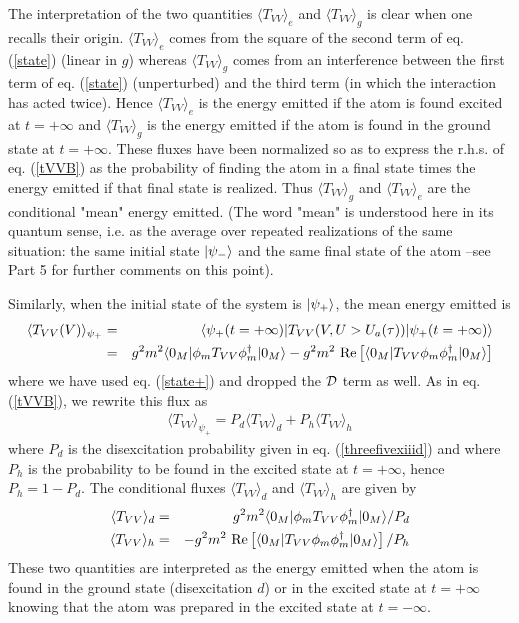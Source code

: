 \documentclass[12pt]{article}
\begin{document}
 The interpretation of the two quantities $\langle T_{VV}\rangle _{e}$ and
$\langle T_{VV} \rangle _{g}$ is clear when one
recalls their origin. $\langle T_{VV}\rangle _{e}$
comes from the square of the second term of eq.
(\ref{state}) (linear in $g$) whereas $\langle T_{VV} \rangle _{g}$ comes
from an interference between the first term of eq. (\ref{state})
(unperturbed) and the third term (in which the interaction has acted twice).
Hence $\langle T_{VV}\rangle _{e}$ is the energy emitted
if the atom is found excited at $t=+\infty$ and $\langle T_{VV}\rangle _{g}$
is the energy emitted if the atom
is found in the ground state at $t=+\infty$. These fluxes
have been normalized so as to express
the r.h.s. of eq. (\ref{tVVB})  as the probability of finding the atom in
a final state times the energy
emitted if that final state is realized.
Thus $\langle T_{VV} \rangle _{g}$  and $\langle T_{VV}\rangle _{e}$
are the conditional "mean" energy emitted. (The word "mean"  is understood
here in its quantum sense, i.e. as the average over repeated realizations
of the same situation: the same initial state $\mbox{$ \vert \psi_- \rangle $}$ and the same
final state of the atom --see Part 5 for further comments on this point).

Similarly, when the initial state of the system is $\mbox{$ \vert \psi_+ \rangle $}$,
the mean energy emitted is
\begin{eqnarray}
\langle T_{VV}(V)\rangle _{\psi_+} &=&
\mbox{$ \langle \psi_+(t=+\infty) \vert $} T_{VV} (V, U>U_a(\tau))\mbox{$ \vert \psi_+
(t=+\infty) \rangle $}
\nonumber\\
&=&
g^2m^2 \mbox{$ \langle 0_M \vert $} \phi_m  T_{VV} \phi_m^\dagger\mbox{$ \vert 0_M \rangle $}
-  g^2m^2 \mbox{ Re}\left[
\mbox{$ \langle 0_M \vert $}  T_{VV} \phi_m  \phi_m^\dagger\mbox{$ \vert 0_M \rangle $}
\right]
\label{tVV+}
\end{eqnarray}
where we have used eq. (\ref{state+}) and dropped the $\cal{D}$ term as well.
As in eq. (\ref{tVVB}), we rewrite this flux as
\begin{eqnarray}
\langle T_{VV}\rangle _{\psi_+} = P_d \langle T_{VV} \rangle _{d}
+  P_h \langle T_{VV} \rangle _{h}
\label{tVVB+}
\end{eqnarray}
where $P_d$ is the disexcitation probability given in eq.
(\ref{threefivexiiid})
and where
$P_h$ is
the probability to be found in the excited state at $t=+\infty$, hence
$
P_h =  1- P_d
$.
The conditional fluxes $\langle T_{VV}\rangle _{d}$ and
$\langle T_{VV}\rangle _{h}$ are given by
\begin{eqnarray}
\langle T_{VV}\rangle _{d}
 &=& g^2m^2 \mbox{$ \langle 0_M \vert $} \phi_m T_{VV} \phi_m^\dagger
\mbox{$ \vert 0_M \rangle $}/ P_d\nonumber\\
\langle T_{VV}\rangle _{h}
&=& - g^2m^2\mbox{ Re}\left[
 \mbox{$ \langle 0_M \vert $}  T_{VV} \phi_m \phi_m^\dagger \mbox{$ \vert 0_M \rangle $} \right]/ P_h
\label{50b}
\end{eqnarray}
These two quantities
are interpreted as the energy emitted when the atom is found
in the ground state (disexcitation $d$)
or in the excited state at $t=+\infty$ knowing that the atom was prepared
in the
excited state at $t=- \infty$.
\end{document}
